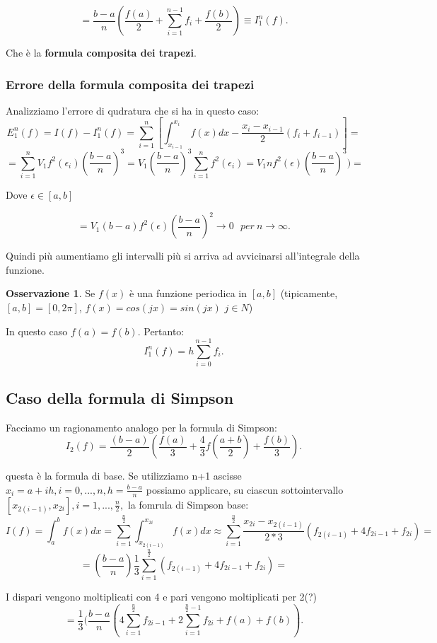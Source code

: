 \documentclass[11pt]{article}
\theoremstyle{definition}
\newtheorem{oss}{Osservazione}
\theoremstyle{plain}
\begin{document}
\[
	=\frac{b-a}{n}(\frac{f(a)}{2}+\sum_{i=1}^{n-1} f_{i}+\frac{f(b)}{2})\equiv I_1^{n}(f)
.\] 

Che è la \textbf{formula composita dei trapezi}.

\subsubsection{Errore della formula composita dei trapezi}

Analizziamo l'errore di qudratura che si ha in questo caso:
\[
	E_1^{n}(f)=I(f)-I_1^{n}(f)=\sum_{i=1}^{n}[ \int_{x_{i-1}}^{x_{i}}f(x)dx-\frac{x_{i}-x_{i-1}}{2}(f_{i}+f_{i-1})]=
\] 
\[
	=\sum_{i=1}^{n} V_1f^{2}(\epsilon_i)(\frac{b-a}{n})^{3}=V_1(\frac{b-a}{n})^{3}\sum_{i=1}^{n} f^{2}(\epsilon_i)=V_1nf^{2}(\epsilon)(\frac{b-a}{n})^{3})=
\] 

Dove $\epsilon \in [a,b]$ 

\[
	=V_1(b-a)f^{2}(\epsilon)(\frac{b-a}{n})^{2}\to 0\ \ \ per\ n\to \infty
.\] 

Quindi più aumentiamo gli intervalli più si arriva ad avvicinarsi all'integrale della funzione.


\begin{oss}
	Se $f(x)$ è una funzione periodica in $[a,b]$ (tipicamente, $[a,b]=[0,2\pi]$, $f(x)=cos(jx)=sin(jx)$ $j\in N$)

	In questo caso $f(a)=f(b)$. Pertanto:
	\[
		I_1^{n}(f)=h\sum_{i=0}^{n-1} f_{i}
	.\] 
\end{oss}


\subsection{Caso della formula di Simpson}
Facciamo un ragionamento analogo per la formula di Simpson:
\[
	I_2(f)=\frac{(b-a)}{2}(\frac{f(a)}{3}+\frac{4}{3}f(\frac{a+b}{2})+\frac{f(b)}{3})
.\] 

questa è la formula di base. Se utilizziamo n+1 ascisse $x_{i}=a+ih,i=0,...,n,h=\frac{b-a}{n}$ possiamo applicare, su ciascun sottointervallo $[x_{2(i-1)},x_{2i}],i=1,...,\frac{n}{2},$ la fomrula di Simpson base:
\[
	I(f)=\int_{a}^{b}f(x)dx=\sum_{i=1}^{\frac{n}{2}} \int_{x_{2(i-1)}}^{x_{2i}}f(x)dx\approx \sum_{i=1}^{\frac{n}{2}} \frac{x_{2i}-x_{2(i-1)}}{2*3}(f_{2(i-1)}+4f_{2i-1}+f_{2i})=
\] 
\[
	=(\frac{b-a}{n})\frac{1}{3}\sum_{i=1}^{\frac{n}{2}} (f_{2(i-1)}+4f_{2i-1}+f_{2i})=
\] 

I dispari vengono moltiplicati con 4 e pari vengono moltiplicati per 2(?)
\[
	=\frac{1}{3}(\frac{b-a}{n}(4\sum_{i=1}^{\frac{n}{2}} f_{2i-1}+2\sum_{i=1}^{\frac{n}{2}-1} f_{2i}+f(a)+f(b))
.\] 
\end{document}
